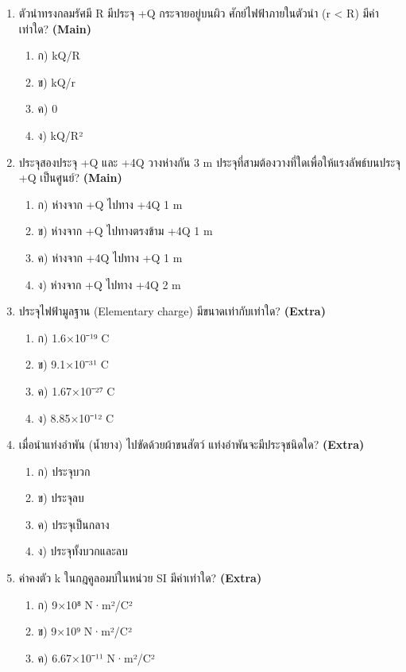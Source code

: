 \documentclass[12pt]{article}
\begin{document}
\begin{enumerate}[label=\arabic*.]
\begin{enumerate}[label=)]
\item ง) 0
\end{enumerate}
\item ตัวนำทรงกลมรัศมี R มีประจุ +Q กระจายอยู่บนผิว ศักย์ไฟฟ้าภายในตัวนำ (r < R) มีค่าเท่าใด? \hfill \textbf{\small (Main)}
\begin{enumerate}[label=)]
\item ก) kQ/R
\item ข) kQ/r
\item ค) 0
\item ง) kQ/R²
\end{enumerate}
\item ประจุสองประจุ +Q และ +4Q วางห่างกัน 3 m ประจุที่สามต้องวางที่ใดเพื่อให้แรงลัพธ์บนประจุ +Q เป็นศูนย์? \hfill \textbf{\small (Main)}
\begin{enumerate}[label=)]
\item ก) ห่างจาก +Q ไปทาง +4Q 1 m
\item ข) ห่างจาก +Q ไปทางตรงข้าม +4Q 1 m
\item ค) ห่างจาก +4Q ไปทาง +Q 1 m
\item ง) ห่างจาก +Q ไปทาง +4Q 2 m
\end{enumerate}
\item ประจุไฟฟ้ามูลฐาน (Elementary charge) มีขนาดเท่ากับเท่าใด? \hfill \textbf{\small (Extra)}
\begin{enumerate}[label=)]
\item ก) 1.6×10⁻¹⁹ C
\item ข) 9.1×10⁻³¹ C
\item ค) 1.67×10⁻²⁷ C
\item ง) 8.85×10⁻¹² C
\end{enumerate}
\item เมื่อนำแท่งอำพัน (น้ำยาง) ไปขัดด้วยผ้าขนสัตว์ แท่งอำพันจะมีประจุชนิดใด? \hfill \textbf{\small (Extra)}
\begin{enumerate}[label=)]
\item ก) ประจุบวก
\item ข) ประจุลบ
\item ค) ประจุเป็นกลาง
\item ง) ประจุทั้งบวกและลบ
\end{enumerate}
\item ค่าคงตัว k ในกฎคูลอมบ์ในหน่วย SI มีค่าเท่าใด? \hfill \textbf{\small (Extra)}
\begin{enumerate}[label=)]
\item ก) 9×10⁸ N·m²/C²
\item ข) 9×10⁹ N·m²/C²
\item ค) 6.67×10⁻¹¹ N·m²/C²

\end{enumerate}
\end{enumerate}
\end{document}
